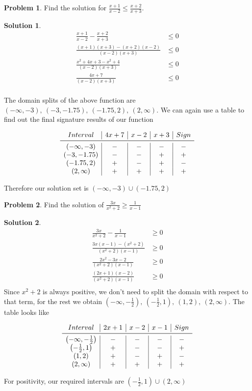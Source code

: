 \documentclass[a4paper]{article}
\theoremstyle{definition}
\newtheorem{problem}{Problem}[section]
\newtheorem*{solution}{Solution}
\begin{document}
\begin{problem}
Find the solution for \(\frac{x+1}{x-2} \leq \frac{x+2}{x+3}\).
\end{problem}
\begin{solution}
\begin{align*}
\frac{x+1}{x-2} - \frac{x+2}{x+3} &\leq 0 \\
\frac{(x+1)(x+3) - (x+2)(x-2)}{(x-2)(x+3)} &\leq 0 \\
\frac{x^2 +4x + 3 - x^2 + 4}{(x-2)(x+3)} &\leq 0 \\
\frac{4x + 7}{(x-2)(x+3)} &\leq 0 \\
\end{align*}

The domain splits of the above function are \((-\infty, -3),\ (-3, -1.75),\ (-1.75, 2),\ (2, \infty)\). We can again use a table to find out the final signature results of our function

\[
\begin{array}{c|c|c|c|c}
Interval & 4x+7 & x-2 & x+3 & Sign \\
\midrule
(-\infty, -3) & - & - & - & - \\
(-3, -1.75) & - & - & + & + \\
(-1.75, 2) & + & - & + & - \\
(2, \infty) & + & + & + & + \\
\end{array}
\]

Therefore our solution set is \((-\infty, -3) \cup (-1.75, 2)\)
\end{solution}

\begin{problem}
Find the solution of \(\frac{3x}{x^2+2} \geq \frac{1}{x-1}\)
\end{problem}
\begin{solution}
\begin{align*}
\frac{3x}{x^2+2} - \frac{1}{x-1} &\geq 0 \\
\frac{3x(x-1) - (x^2+2)}{(x^2+2)(x-1)} &\geq 0 \\
\frac{2x^2 -3x -2}{(x^2+2)(x-1)} &\geq 0 \\
\frac{(2x+1)(x-2)}{(x^2+2)(x-1)} &\geq 0 \\
\end{align*}
Since \(x^2+2\) is always positive, we don't need to split the domain with respect to that term, for the rest we obtain \(\left(-\infty, -\frac{1}{2}\right),\ \left(-\frac{1}{2}, 1\right),\ (1, 2),\ (2, \infty)\). The table looks like

\[
\begin{array}{c|c|c|c|c}
Interval & 2x+1 & x-2 & x-1 & Sign \\
\midrule
\left(-\infty, -\frac{1}{2}\right) & - & - & - & - \\
\left(-\frac{1}{2}, 1\right) & + & - & - & + \\
(1, 2) & + & - & + & - \\
(2, \infty) & + & + & + & + 
\end{array}
\]

For positivity, our required intervals are \(\left(-\frac{1}{2}, 1\right) \cup (2, \infty)\)
\end{solution}
\end{document}
